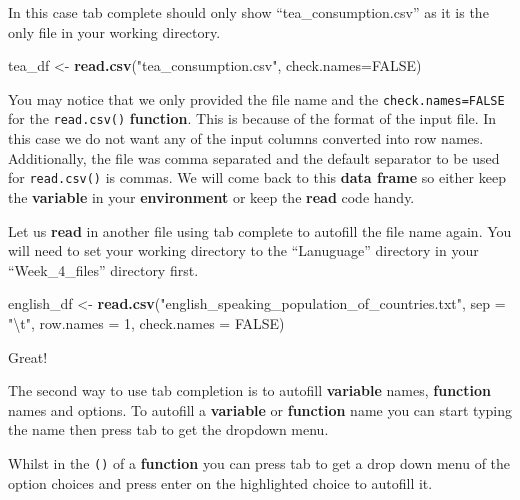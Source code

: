 \documentclass[]{book}
\newenvironment{Shaded}{\begin{snugshade}}{\end{snugshade}}
\newcommand{\KeywordTok}[1]{\textcolor[rgb]{0.13,0.29,0.53}{\textbf{#1}}}
\newcommand{\DataTypeTok}[1]{\textcolor[rgb]{0.13,0.29,0.53}{#1}}
\newcommand{\DecValTok}[1]{\textcolor[rgb]{0.00,0.00,0.81}{#1}}
\newcommand{\CharTok}[1]{\textcolor[rgb]{0.31,0.60,0.02}{#1}}
\newcommand{\StringTok}[1]{\textcolor[rgb]{0.31,0.60,0.02}{#1}}
\newcommand{\OtherTok}[1]{\textcolor[rgb]{0.56,0.35,0.01}{#1}}
\newcommand{\NormalTok}[1]{#1}
\begin{document}
In this case tab complete should only show ``tea\_consumption.csv'' as
it is the only file in your working directory.

\begin{Shaded}
\begin{Highlighting}[]
\NormalTok{tea_df <-}\StringTok{ }\KeywordTok{read.csv}\NormalTok{(}\StringTok{"tea_consumption.csv"}\NormalTok{, }\DataTypeTok{check.names=}\OtherTok{FALSE}\NormalTok{)}
\end{Highlighting}
\end{Shaded}

You may notice that we only provided the file name and the
\texttt{check.names=FALSE} for the \texttt{read.csv()}
\textbf{function}. This is because of the format of the input file. In
this case we do not want any of the input columns converted into row
names. Additionally, the file was comma separated and the default
separator to be used for \texttt{read.csv()} is commas. We will come
back to this \textbf{data frame} so either keep the \textbf{variable} in
your \textbf{environment} or keep the \textbf{read} code handy.

Let us \textbf{read} in another file using tab complete to autofill the
file name again. You will need to set your working directory to the
``Lanuguage'' directory in your ``Week\_4\_files'' directory first.

\begin{Shaded}
\begin{Highlighting}[]
\NormalTok{english_df <-}\StringTok{ }\KeywordTok{read.csv}\NormalTok{(}\StringTok{"english_speaking_population_of_countries.txt"}\NormalTok{, }
                   \DataTypeTok{sep =} \StringTok{"}\CharTok{\textbackslash{}t}\StringTok{"}\NormalTok{, }
                   \DataTypeTok{row.names =} \DecValTok{1}\NormalTok{,}
                   \DataTypeTok{check.names =} \OtherTok{FALSE}\NormalTok{)}
\end{Highlighting}
\end{Shaded}

Great!

The second way to use tab completion is to autofill \textbf{variable}
names, \textbf{function} names and options. To autofill a
\textbf{variable} or \textbf{function} name you can start typing the
name then press tab to get the dropdown menu.

Whilst in the \texttt{()} of a \textbf{function} you can press tab to
get a drop down menu of the option choices and press enter on the
highlighted choice to autofill it.
\end{document}
